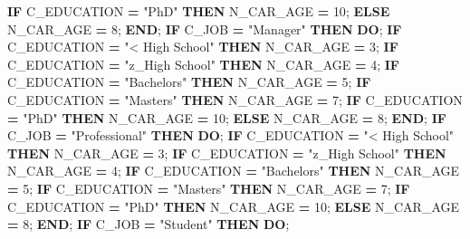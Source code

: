 \documentclass[]{article}
\newenvironment{Shaded}{\begin{snugshade}}{\end{snugshade}}
\newcommand{\KeywordTok}[1]{\textcolor[rgb]{0.13,0.29,0.53}{\textbf{{#1}}}}
\newcommand{\DecValTok}[1]{\textcolor[rgb]{0.00,0.00,0.81}{{#1}}}
\newcommand{\StringTok}[1]{\textcolor[rgb]{0.31,0.60,0.02}{{#1}}}
\newcommand{\NormalTok}[1]{{#1}}
\begin{document}
\begin{Shaded}
\begin{Highlighting}[]
            \KeywordTok{IF} \NormalTok{C_EDUCATION }\KeywordTok{=} \StringTok{"PhD"} \KeywordTok{THEN} \NormalTok{N_CAR_AGE }\KeywordTok{=} \DecValTok{10}\NormalTok{;}
            \KeywordTok{ELSE} \NormalTok{N_CAR_AGE }\KeywordTok{=} \DecValTok{8}\NormalTok{;}
        \KeywordTok{END}\NormalTok{;}
        \KeywordTok{IF} \NormalTok{C_JOB }\KeywordTok{=} \StringTok{"Manager"} \KeywordTok{THEN} \KeywordTok{DO}\NormalTok{;}
            \KeywordTok{IF} \NormalTok{C_EDUCATION }\KeywordTok{=} \StringTok{"< High School"} \KeywordTok{THEN} \NormalTok{N_CAR_AGE }\KeywordTok{=} \DecValTok{3}\NormalTok{;}
            \KeywordTok{IF} \NormalTok{C_EDUCATION }\KeywordTok{=} \StringTok{"z_High School"} \KeywordTok{THEN} \NormalTok{N_CAR_AGE }\KeywordTok{=} \DecValTok{4}\NormalTok{;}
            \KeywordTok{IF} \NormalTok{C_EDUCATION }\KeywordTok{=} \StringTok{"Bachelors"} \KeywordTok{THEN} \NormalTok{N_CAR_AGE }\KeywordTok{=} \DecValTok{5}\NormalTok{;}
            \KeywordTok{IF} \NormalTok{C_EDUCATION }\KeywordTok{=} \StringTok{"Masters"} \KeywordTok{THEN} \NormalTok{N_CAR_AGE }\KeywordTok{=} \DecValTok{7}\NormalTok{;}
            \KeywordTok{IF} \NormalTok{C_EDUCATION }\KeywordTok{=} \StringTok{"PhD"} \KeywordTok{THEN} \NormalTok{N_CAR_AGE }\KeywordTok{=} \DecValTok{10}\NormalTok{;}
            \KeywordTok{ELSE} \NormalTok{N_CAR_AGE }\KeywordTok{=} \DecValTok{8}\NormalTok{;}
        \KeywordTok{END}\NormalTok{;}
        \KeywordTok{IF} \NormalTok{C_JOB }\KeywordTok{=} \StringTok{"Professional"} \KeywordTok{THEN} \KeywordTok{DO}\NormalTok{;}
            \KeywordTok{IF} \NormalTok{C_EDUCATION }\KeywordTok{=} \StringTok{"< High School"} \KeywordTok{THEN} \NormalTok{N_CAR_AGE }\KeywordTok{=} \DecValTok{3}\NormalTok{;}
            \KeywordTok{IF} \NormalTok{C_EDUCATION }\KeywordTok{=} \StringTok{"z_High School"} \KeywordTok{THEN} \NormalTok{N_CAR_AGE }\KeywordTok{=} \DecValTok{4}\NormalTok{;}
            \KeywordTok{IF} \NormalTok{C_EDUCATION }\KeywordTok{=} \StringTok{"Bachelors"} \KeywordTok{THEN} \NormalTok{N_CAR_AGE }\KeywordTok{=} \DecValTok{5}\NormalTok{;}
            \KeywordTok{IF} \NormalTok{C_EDUCATION }\KeywordTok{=} \StringTok{"Masters"} \KeywordTok{THEN} \NormalTok{N_CAR_AGE }\KeywordTok{=} \DecValTok{7}\NormalTok{;}
            \KeywordTok{IF} \NormalTok{C_EDUCATION }\KeywordTok{=} \StringTok{"PhD"} \KeywordTok{THEN} \NormalTok{N_CAR_AGE }\KeywordTok{=} \DecValTok{10}\NormalTok{;}
            \KeywordTok{ELSE} \NormalTok{N_CAR_AGE }\KeywordTok{=} \DecValTok{8}\NormalTok{;}
        \KeywordTok{END}\NormalTok{;}
        \KeywordTok{IF} \NormalTok{C_JOB }\KeywordTok{=} \StringTok{"Student"} \KeywordTok{THEN} \KeywordTok{DO}\NormalTok{;}

\end{Highlighting}
\end{Shaded}
\end{document}
